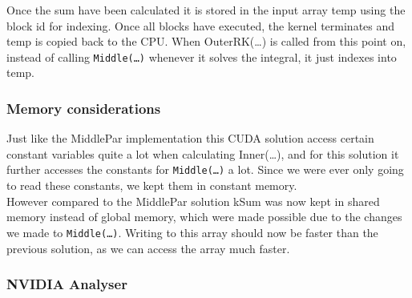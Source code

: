 Once the sum have been calculated it is stored in the input array temp using the block id for indexing. Once all blocks have executed, the kernel terminates and temp is copied back to the CPU. When OuterRK(…) is called from this point on, instead of calling \texttt{Middle(…)} whenever it solves the integral, it just indexes into temp.

\subsubsection{Memory considerations} \hfill
Just like the MiddlePar implementation this CUDA solution access certain constant variables quite a lot when calculating Inner(…), and for this solution it further accesses the constants for \texttt{Middle(…)} a lot. Since we were ever only going to read these constants, we kept them in constant memory.\\

However compared to the MiddlePar solution kSum was now kept in shared memory instead of global memory, which were made possible due to the changes we made to \texttt{Middle(…)}. Writing to this array should now be faster than the previous solution, as we can access the array much faster.

\subsubsection{NVIDIA Analyser} \hfill